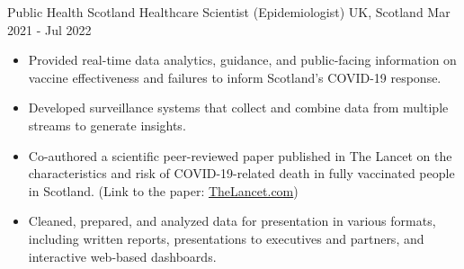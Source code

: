 \cventry
{Public Health Scotland} %
{Healthcare Scientist (Epidemiologist)} %
{UK, Scotland} %
{Mar 2021 - Jul 2022} %
{
\begin{itemize}
    \item Provided real-time data analytics, guidance, and public-facing information on 
vaccine effectiveness and failures to inform Scotland's COVID-19 response.
   \item Developed surveillance systems that collect and combine data from 
   multiple streams to generate insights.
   \item Co-authored a scientific peer-reviewed paper published in The Lancet on the characteristics and risk of COVID-19-related death in fully vaccinated people in Scotland. (Link to the paper: \href{https://www.thelancet.com/journals/lancet/article/PIIS0140-6736(21)02316-3/fulltext}{TheLancet.com})
   \item Cleaned, prepared, and analyzed data for presentation in various 
   formats, including written reports, presentations to executives and 
   partners, and interactive web-based dashboards.
\end{itemize}
}
